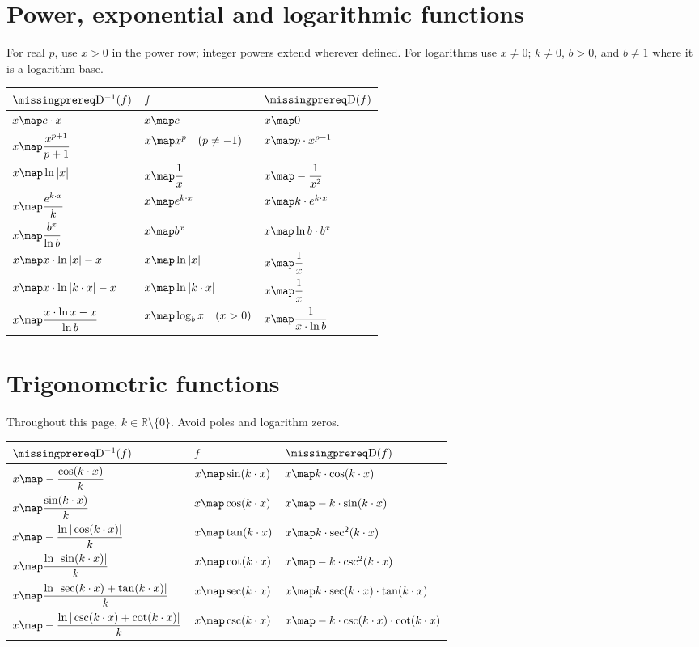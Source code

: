 \documentclass[10pt]{article}
\begin{document}
\section*{Power, exponential and logarithmic functions}
For real $p$, use $x>0$ in the power row; integer powers extend wherever defined.
For logarithms use $x\ne0$; $k\ne0$, $b>0$, and $b\ne1$ where it is a logarithm base.

\begin{tabularx}{\textwidth}{|Y|Y|Y|}
\hline
$\DiffOp^{-1}(f)$ & $f$ & $\DiffOp(f)$ \\ \hline
$\displaystyle x\map c\cdot x$ & $x\map c$ & $x\map0$ \\ \hline
$\displaystyle x\map\frac{x^{p+1}}{p+1}$ & $x\map x^p\quad(p\ne-1)$ & $x\map p\cdot x^{p-1}$ \\ \hline
$x\map\ln|x|$ & $\displaystyle x\map\frac1x$ & $\displaystyle x\map-\frac1{x^2}$ \\ \hline
$\displaystyle x\map\frac{e^{k\cdot x}}k$ & $x\map e^{k\cdot x}$ & $x\map k\cdot e^{k\cdot x}$ \\ \hline
$\displaystyle x\map\frac{b^x}{\ln b}$ & $x\map b^x$ & $x\map\ln b\cdot b^x$ \\ \hline
$x\map x\cdot\ln|x|-x$ & $x\map\ln|x|$ & $\displaystyle x\map\frac1x$ \\ \hline
$x\map x\cdot\ln|k\cdot x|-x$ & $x\map\ln|k\cdot x|$ & $\displaystyle x\map\frac1x$ \\ \hline
$\displaystyle x\map\frac{x\cdot\ln x-x}{\ln b}$ & $x\map\log_b x\quad(x>0)$ & $\displaystyle x\map\frac1{x\cdot\ln b}$ \\ \hline
\end{tabularx}

\clearpage
\section*{Trigonometric functions}
Throughout this page, $k\in\mathbb R\setminus\{0\}$. Avoid poles and logarithm zeros.

\begin{tabularx}{\textwidth}{|Y|Y|Y|}
\hline
$\DiffOp^{-1}(f)$ & $f$ & $\DiffOp(f)$ \\ \hline
$\displaystyle x\map-\frac{\cos(k\cdot x)}k$ & $x\map\sin(k\cdot x)$ & $x\map k\cdot\cos(k\cdot x)$ \\ \hline
$\displaystyle x\map\frac{\sin(k\cdot x)}k$ & $x\map\cos(k\cdot x)$ & $x\map-k\cdot\sin(k\cdot x)$ \\ \hline
$\displaystyle x\map-\frac{\ln|\cos(k\cdot x)|}k$ & $x\map\tan(k\cdot x)$ & $x\map k\cdot\sec^2(k\cdot x)$ \\ \hline
$\displaystyle x\map\frac{\ln|\sin(k\cdot x)|}k$ & $x\map\cot(k\cdot x)$ & $x\map-k\cdot\csc^2(k\cdot x)$ \\ \hline
$\displaystyle x\map\frac{\ln|\sec(k\cdot x)+\tan(k\cdot x)|}k$ & $x\map\sec(k\cdot x)$ & $x\map k\cdot\sec(k\cdot x)\cdot\tan(k\cdot x)$ \\ \hline
$\displaystyle x\map-\frac{\ln|\csc(k\cdot x)+\cot(k\cdot x)|}k$ & $x\map\csc(k\cdot x)$ & $x\map-k\cdot\csc(k\cdot x)\cdot\cot(k\cdot x)$ \\ \hline
\end{tabularx}
\end{document}
